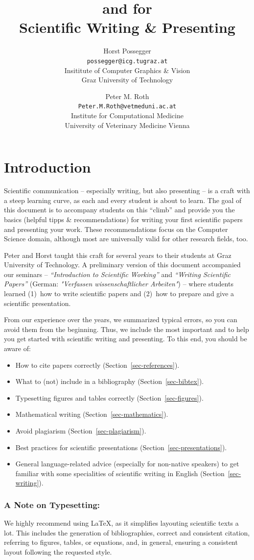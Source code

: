 \documentclass[11pt,a4paper]{article}
\author{
Horst Possegger\\[3mm]
{\small \texttt{possegger@icg.tugraz.at}}\\[3mm]
{\color{lgray}\scriptsize Insititute of Computer Graphics \& Vision\\[-1mm]
Graz University of Technology}
\and
Peter M. Roth\\[3mm]
{\small \texttt{Peter.M.Roth@vetmeduni.ac.at}}\\[3mm]
{\color{lgray}\scriptsize Institute for Computational Medicine\\[-1mm]
University of Veterinary Medicine Vienna}
}
\title{\goodstyle{Dos} and \badstyle{Don'ts} for\\[0.5em]Scientific Writing \& Presenting}
\begin{document}
\tableofcontents
\pagebreak

\section{Introduction}
\label{sec-intro}
Scientific communication -- especially writing, but also presenting -- is a craft with a steep learning curve, as each and every student is about to learn.
The goal of this document is to accompany students on this ``climb'' and provide you the basics (helpful tipps \& recommendations) for writing your first scientific papers and presenting your work.
These recommendations focus on the Computer Science domain, although most are universally valid for other research fields, too.

Peter and Horst taught this craft for several years to their students at Graz University of Technology.
A preliminary version of this document accompanied our seminars -- \emph{``Introduction to Scientific Working''} and \emph{``Writing Scientific Papers''} (German: \emph{"Verfassen wissenschaftlicher Arbeiten"}) -- where students learned (1)~how to write scientific papers and (2)~how to prepare and give a scientific presentation. 

From our experience over the years, we summarized typical errors, so you can avoid them from the beginning.
Thus, we include the most important  and  to help you get started with scientific writing and presenting.
To this end, you should be aware of:
\begin{itemize}
\item How to cite papers correctly (Section~\ref{sec-references}).
\item What to (not) include in a bibliography (Section~\ref{sec-bibtex}).
\item Typesetting figures and tables correctly (Section~\ref{sec-figures}).
\item Mathematical writing (Section~\ref{sec-mathematics}).
\item Avoid plagiarism (Section~\ref{sec-plagiarism}).
\item Best practices for scientific presentations (Section~\ref{sec-presentations}).
\item General language-related advice (especially for non-native speakers) to get familiar with some specialities of scientific writing in English (Section~\ref{sec-writing}).
\end{itemize}

\subsubsection*{A Note on Typesetting:}
We highly recommend using \LaTeX, as it simplifies layouting scientific texts a lot.
This includes the generation of bibliographies, correct and consistent citation, referring to figures, tables, or equations, and, in general, ensuring a consistent layout following the requested style. 
\end{document}
